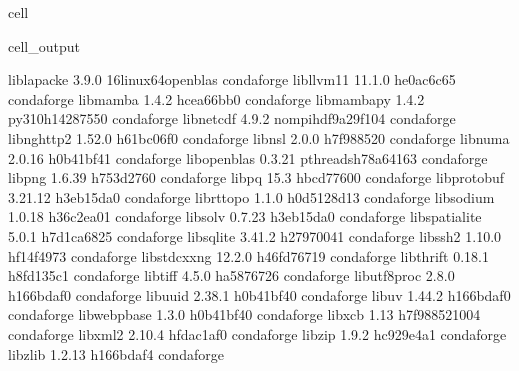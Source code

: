 \documentclass[letterpaper,table,10pt,english]{jupyterBook}
\begin{document}
\begin{sphinxuseclass}{cell}
\begin{sphinxVerbatimOutput}
\begin{sphinxuseclass}{cell_output}
\begin{sphinxVerbatim}[commandchars=\\\{\}]
liblapacke                3.9.0           16\PYGZus{}linux64\PYGZus{}openblas    conda\PYGZhy{}forge
libllvm11                 11.1.0               he0ac6c6\PYGZus{}5    conda\PYGZhy{}forge
libmamba                  1.4.2                hcea66bb\PYGZus{}0    conda\PYGZhy{}forge
libmambapy                1.4.2           py310h1428755\PYGZus{}0    conda\PYGZhy{}forge
libnetcdf                 4.9.2           nompi\PYGZus{}hdf9a29f\PYGZus{}104    conda\PYGZhy{}forge
libnghttp2                1.52.0               h61bc06f\PYGZus{}0    conda\PYGZhy{}forge
libnsl                    2.0.0                h7f98852\PYGZus{}0    conda\PYGZhy{}forge
libnuma                   2.0.16               h0b41bf4\PYGZus{}1    conda\PYGZhy{}forge
libopenblas               0.3.21          pthreads\PYGZus{}h78a6416\PYGZus{}3    conda\PYGZhy{}forge
libpng                    1.6.39               h753d276\PYGZus{}0    conda\PYGZhy{}forge
libpq                     15.3                 hbcd7760\PYGZus{}0    conda\PYGZhy{}forge
libprotobuf               3.21.12              h3eb15da\PYGZus{}0    conda\PYGZhy{}forge
librttopo                 1.1.0               h0d5128d\PYGZus{}13    conda\PYGZhy{}forge
libsodium                 1.0.18               h36c2ea0\PYGZus{}1    conda\PYGZhy{}forge
libsolv                   0.7.23               h3eb15da\PYGZus{}0    conda\PYGZhy{}forge
libspatialite             5.0.1               h7d1ca68\PYGZus{}25    conda\PYGZhy{}forge
libsqlite                 3.41.2               h2797004\PYGZus{}1    conda\PYGZhy{}forge
libssh2                   1.10.0               hf14f497\PYGZus{}3    conda\PYGZhy{}forge
libstdcxx\PYGZhy{}ng              12.2.0              h46fd767\PYGZus{}19    conda\PYGZhy{}forge
libthrift                 0.18.1               h8fd135c\PYGZus{}1    conda\PYGZhy{}forge
libtiff                   4.5.0                ha587672\PYGZus{}6    conda\PYGZhy{}forge
libutf8proc               2.8.0                h166bdaf\PYGZus{}0    conda\PYGZhy{}forge
libuuid                   2.38.1               h0b41bf4\PYGZus{}0    conda\PYGZhy{}forge
libuv                     1.44.2               h166bdaf\PYGZus{}0    conda\PYGZhy{}forge
libwebp\PYGZhy{}base              1.3.0                h0b41bf4\PYGZus{}0    conda\PYGZhy{}forge
libxcb                    1.13              h7f98852\PYGZus{}1004    conda\PYGZhy{}forge
libxml2                   2.10.4               hfdac1af\PYGZus{}0    conda\PYGZhy{}forge
libzip                    1.9.2                hc929e4a\PYGZus{}1    conda\PYGZhy{}forge
libzlib                   1.2.13               h166bdaf\PYGZus{}4    conda\PYGZhy{}forge

\end{sphinxVerbatim}
\end{sphinxuseclass}
\end{sphinxVerbatimOutput}
\end{sphinxuseclass}
\end{document}
